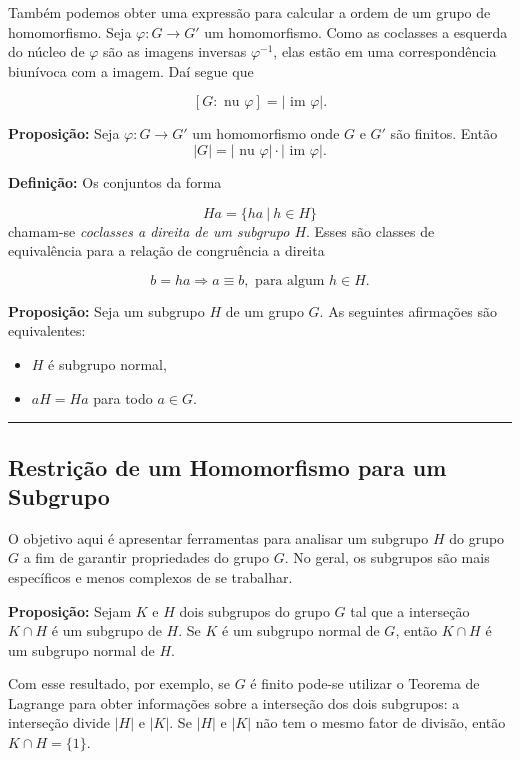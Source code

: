 \documentclass[11pt]{article}
\providecommand{\tightlist}{%
      \setlength{\itemsep}{0pt}\setlength{\parskip}{0pt}}
\begin{document}
Também podemos obter uma expressão para calcular a ordem de um grupo de
homomorfismo. Seja \(\varphi: G\longrightarrow G'\) um homomorfismo.
Como as coclasses a esquerda do núcleo de \(\varphi\) são as imagens
inversas \(\varphi^{-1}\), elas estão em uma correspondência biunívoca
com a imagem. Daí segue que

\[[G:\text{ nu }\varphi] = |\text{ im }\varphi|.\]

\textbf{Proposição:} Seja \(\varphi: G\longrightarrow G'\) um
homomorfismo onde \(G\) e \(G'\) são finitos. Então
\[|G| = |\text{ nu }\varphi|\cdot|\text{ im }\varphi|.\]

\textbf{Definição:} Os conjuntos da forma

\[Ha = \{ha \ | \ h \in H\}\] chamam-se \emph{coclasses a direita de um
subgrupo \(H\)}. Esses são classes de equivalência para a relação de
congruência a direita

\[b = ha \Rightarrow a \equiv b, \text{ para algum }h \in H.\]

\textbf{Proposição:} Seja um subgrupo \(H\) de um grupo \(G\). As
seguintes afirmações são equivalentes:

\begin{itemize}
\tightlist
\item
  \(H\) é subgrupo normal,
\item
  \(aH = Ha\) para todo \(a\in G\).
\end{itemize}

\begin{center}\rule{0.5\linewidth}{0.5pt}\end{center}

\hypertarget{restriuxe7uxe3o-de-um-homomorfismo-para-um-subgrupo}{%
\subsection{Restrição de um Homomorfismo para um
Subgrupo}\label{restriuxe7uxe3o-de-um-homomorfismo-para-um-subgrupo}}

O objetivo aqui é apresentar ferramentas para analisar um subgrupo \(H\)
do grupo \(G\) a fim de garantir propriedades do grupo \(G\). No geral,
os subgrupos são mais específicos e menos complexos de se trabalhar.

\textbf{Proposição:} Sejam \(K\) e \(H\) dois subgrupos do grupo \(G\)
tal que a interseção \(K\cap H\) é um subgrupo de \(H\). Se \(K\) é um
subgrupo normal de \(G\), então \(K\cap H\) é um subgrupo normal de
\(H\).

Com esse resultado, por exemplo, se \(G\) é finito pode-se utilizar o
Teorema de Lagrange para obter informações sobre a interseção dos dois
subgrupos: a interseção divide \(|H|\) e \(|K|\). Se \(|H|\) e \(|K|\)
não tem o mesmo fator de divisão, então \(K\cap H = \{1\}\).
\end{document}

